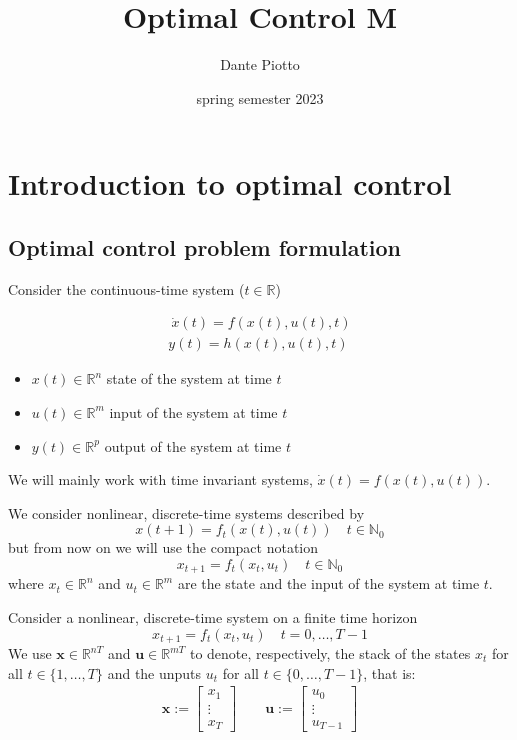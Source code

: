 \documentclass{book}
\title{Optimal Control M}
\author{Dante Piotto}
\date{spring semester 2023}
\newcommand{\R}{\mathbb{R}}
\newcommand{\N}{\mathbb{N}}
\theoremstyle{definition}
\theoremstyle{remark}
\theoremstyle{remark}
\begin{document}
\tableofcontents
\chapter{Introduction to optimal control}

\section{Optimal control problem formulation}
Consider the continuous-time system ($t\in\R$)

\begin{equation}\label{system}
    \begin{gathered}\
        \dot{x}(t) = f(x(t),u(t),t) \\
        y(t) = h(x(t),u(t),t)
    \end{gathered}
\end{equation}

\begin{itemize}
    \item $x(t)\in\R^n$ state of the system at time $t$ 
    \item $u(t)\in\R^m$ input of the system at time $t$ 
    \item $y(t)\in\R^p$ output of the system at time $t$
\end{itemize}
We will mainly work with time invariant systems, $\dot{x}(t)=f(x(t),u(t))$. 

We consider nonlinear, discrete-time systems described by 
\[
    x(t+1)=f_t(x(t),u(t)) \quad t\in\N_0
\]
but from now on we will use the compact notation
\[
    x_{t+1}=f_t(x_t,u_t) \quad t\in\N_0
\]
where $x_t\in\R^n$ and $u_t\in\R^m$ are the state and the input of the system at time $t$.

Consider a nonlinear, discrete-time system on a finite time horizon 
\[
    x_{t+1} = f_t(x_t,u_t) \quad t=0,\dots,T-1
\]
We use $\mathbf{x}\in\R^{nT}$ and $\mathbf{u}\in\R^{mT}$ to denote, respectively, the stack of the states $x_t$ for all $t\in\{1,\dots,T\}$ and the unputs $u_t$ for all $t\in\{0,\dots,T-1\}$, that is:
\begin{gather*}
    \mathbf{x} := \begin{bmatrix}
        x_1 \\ \vdots \\ x_T
    \end{bmatrix} \qquad
    \mathbf{u} := \begin{bmatrix}
        u_0 \\ \vdots \\ u_{T-1}
    \end{bmatrix}
\end{gather*}
\end{document}
